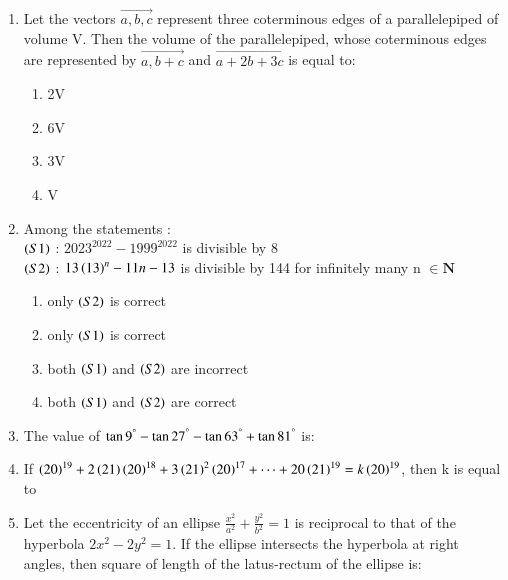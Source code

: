 \documentclass[journal]{IEEEtran}
\numberwithin{equation}{enumi}
\numberwithin{figure}{enumi}
\begin{document}
\begin{enumerate}[start=16]
\begin{multicols}{4}
    \begin{enumerate}
        \item 580
        \item 578
        \item 576
        \item 582
    \end{enumerate} 
    \end{multicols}
    \item Let the vectors $\vec{a,b,c}$ represent three coterminous edges of a parallelepiped of volume V. Then the volume of the parallelepiped, whose coterminous edges are represented by $\vec{a,b+c}$ and $\vec{a+2b+3c}$ is equal to: 
    \begin{multicols}{4} 
    \begin{enumerate}
        \item 2V
        \item 6V
        \item 3V
        \item V
    \end{enumerate} 
    \end{multicols}
    \item Among the statements : \\
    $\left(S1\right)$ : $2023^{2022}-1999^{2022}$ is divisible by $8$ \\
    $\left(S2\right)$ : $13\left(13\right)^{n}-11n-13$ is divisible by 144 for infinitely many n $\in \mathbf{N}$
    \begin{multicols}{2}
    \begin{enumerate}
        \item only $\left(S2\right)$ is correct
        \item only $\left(S1\right)$ is correct
        \item both $\left(S1\right)$ and $\left(S2\right)$ are incorrect
        \item both $\left(S1\right)$ and $\left(S2\right)$ are correct
    \end{enumerate} 
    \end{multicols}
    \item The value of $\tan{9}^{\degree}-\tan{27}^{\degree}-\tan{63}^{\degree}+\tan{81}^{\degree}$ is: 
    \item If $\left(20\right)^{19}+2\left(21\right)\left(20\right)^{18}+3\left(21\right)^{2}\left(20\right)^{17}+\cdots+20\left(21\right)^{19}=k\left(20\right)^{19}$, then k is equal to 

    \item Let the eccentricity of an ellipse $\frac{x^2}{a^2}+\frac{y^2}{b^2}=1$ is reciprocal to that of the hyperbola $2x^2-2y^2=1$. If the ellipse intersects the hyperbola at right angles, then square of length of the latus-rectum of the ellipse is: 


\end{enumerate}
\end{document}
